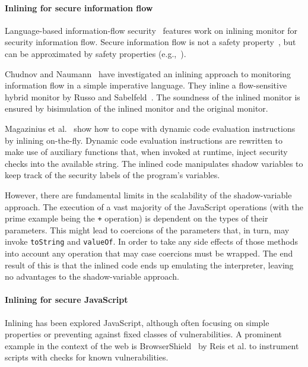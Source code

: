 \documentclass{llncs}
\begin{document}
\paragraph{Inlining for secure information flow}
Language-based information-flow security~\cite{Sabelfeld:Myers:JSAC}
features work on inlining monitor for security information flow.
Secure information flow is not
a safety property~\cite{McLean:SSP94}, but can be approximated by
safety properties
(e.g.,~\cite{Boudol:FAST08,Sabelfeld:Russo:PSI09,Austin:Flanagan:PLAS09}).

Chudnov and
Naumann~\cite{Chudnov:Naumann:CSF10} have investigated an inlining
approach to monitoring information flow in a simple imperative language. They inline a flow-sensitive
hybrid monitor by Russo and
Sabelfeld~\cite{Russo:Sabelfeld:CSF10}. The soundness of the inlined
monitor is ensured by bisimulation of the inlined monitor and the
original monitor.

Magazinius et
al.~\cite{Magazinius+:SEC10,DBLP:journals/compsec/MagaziniusRS12} show
how to cope with dynamic code evaluation instructions by inlining
on-the-fly. 
Dynamic code evaluation instructions are
rewritten to make use of auxiliary functions that, when invoked at
runtime, inject security checks into the available string. 
The inlined code manipulates shadow variables to keep track of the
security labels of the program's variables.

However, there are fundamental limits in the scalability of the shadow-variable
approach.  The execution of a vast majority of the JavaScript operations (with
the prime example being the \lstinline{+} operation) is dependent on the types
of their parameters.  This might lead to coercions of the parameters that, in
turn, may invoke \lstinline{toString} and \lstinline{valueOf}. In order to take
any side effects of those methods into account any operation that may case
coercions must be wrapped. The end result of this is that the inlined code ends
up emulating the interpreter, leaving no advantages to the shadow-variable
approach.

\paragraph{Inlining for secure JavaScript}
Inlining has been explored JavaScript, although often focusing on
simple properties or preventing against fixed classes of vulnerabilities.
A prominent example in the context of the web is
BrowserShield~\cite{Reis+:TWeb07} by Reis et al. to instrument scripts with
checks for known vulnerabilities.
\end{document}
